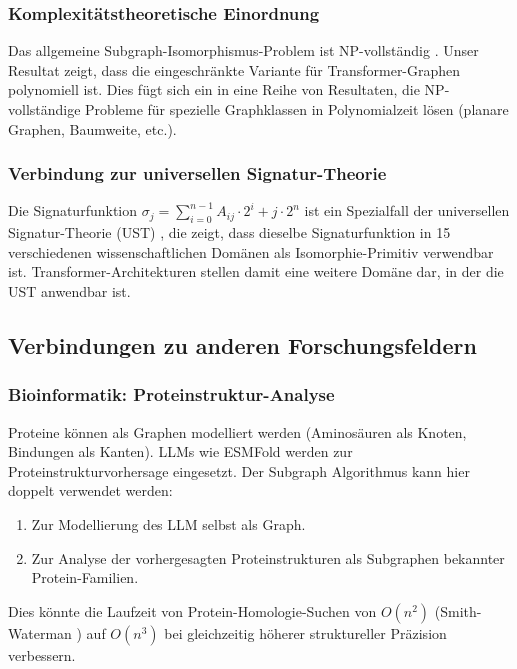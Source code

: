﻿\documentclass[a4paper,12pt]{article}
\theoremstyle{definition}
\begin{document}
\subsubsection{Komplexitätstheoretische Einordnung}

Das allgemeine Subgraph-Isomorphismus-Problem ist NP-vollständig
\cite{cook1971complexity}. Unser Resultat zeigt, dass die eingeschränkte
Variante für Transformer-Graphen polynomiell ist. Dies fügt sich ein in
eine Reihe von Resultaten, die NP-vollständige Probleme für spezielle
Graphklassen in Polynomialzeit lösen (planare Graphen, Baumweite, etc.).

\subsubsection{Verbindung zur universellen Signatur-Theorie}

Die Signaturfunktion $\sigma_j = \sum_{i=0}^{n-1} A_{ij} \cdot 2^i + j \cdot 2^n$
ist ein Spezialfall der universellen Signatur-Theorie (UST) \cite{epp2026ust},
die zeigt, dass dieselbe Signaturfunktion in 15 verschiedenen wissenschaftlichen
Domänen als Isomorphie-Primitiv verwendbar ist. Transformer-Architekturen
stellen damit eine weitere Domäne dar, in der die UST anwendbar ist.

\subsection{Verbindungen zu anderen Forschungsfeldern}

\subsubsection{Bioinformatik: Proteinstruktur-Analyse}

Proteine können als Graphen modelliert werden (Aminosäuren als Knoten,
Bindungen als Kanten). LLMs wie ESMFold \cite{lin2023evolutionary} werden
zur Proteinstrukturvorhersage eingesetzt. Der Subgraph Algorithmus kann
hier doppelt verwendet werden:
\begin{enumerate}
	\item Zur Modellierung des LLM selbst als Graph.
	\item Zur Analyse der vorhergesagten Proteinstrukturen als Subgraphen
	      bekannter Protein-Familien.
\end{enumerate}
Dies könnte die Laufzeit von Protein-Homologie-Suchen von $O(n^2)$
(Smith-Waterman \cite{smith1981identification}) auf $O(n^3)$ bei gleichzeitig
höherer struktureller Präzision verbessern.
\end{document}
